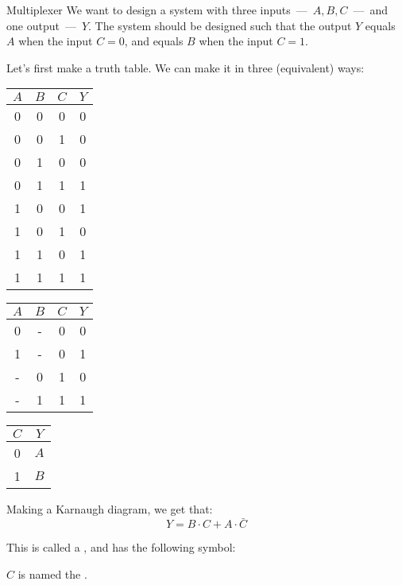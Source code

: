 \documentclass[a4paper]{article}
\begin{document}
\begin{parag}{Multiplexer}
    We want to design a system with three inputs~---~$A, B, C$~---~and one output~---~$Y$. The system should be designed such that the output $Y$ equals $A$ when the input $C = 0$, and equals $B$ when the input $C = 1$.

    Let's first make a truth table. We can make it in three (equivalent) ways:
    \begin{center}
        \begin{tabular}{ccc|c}
            $A$ & $B$ & $C$ & $Y$ \\
            \hline
            0 & 0 & 0 & 0 \\
            0 & 0 & 1 & 0 \\
            0 & 1 & 0 & 0 \\
            0 & 1 & 1 & 1 \\
            1 & 0 & 0 & 1 \\
            1 & 0 & 1 & 0 \\
            1 & 1 & 0 & 1 \\
            1 & 1 & 1 & 1 \\
        \end{tabular}
        \hspace{2em}
        \begin{tabular}{ccc|c}
            $A$ & $B$ & $C$ & $Y$ \\
            \hline
            0 & - & 0 & 0 \\
            1 & - & 0 & 1 \\
            - & 0 & 1 & 0 \\
            - & 1 & 1 & 1 \\
        \end{tabular}
        \hspace{2em}
        \begin{tabular}{c|c}
            $C$ & $Y$ \\
            \hline
            0 & $A$ \\
            1 & $B$ \\
        \end{tabular}
    \end{center}

    Making a Karnaugh diagram, we get that: 
    \[Y =  B\cdot C + A\cdot \bar{C}\]
    
    This is called a , and has the following symbol:

    $C$ is named the .
\end{parag}
\end{document}
